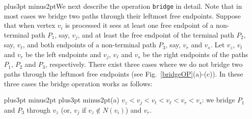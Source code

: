 \documentclass[10pt]{article}
\def\yskip{\penalty-50\vskip3pt plus3pt minus2pt}
\def\y{\yskip}
\def\yy{\yskip\yskip}
\begin{document}
\y We next describe the operation {\tt bridge} in detail. Note
that in most cases we bridge two paths through their leftmost free
endpoints. Suppose that when vertex $v_i$ is processed it sees at
least one free endpoint of a non-terminal path $P_1$, say, $v_j$,
and at least the free endpoint of the terminal path $P_2$, say,
$v_\ell$, and both endpoints of a non-terminal path $P_3$, say,
$v_r$ and $v_s$. Let $v_z$, $v_t$ and $v_r$ be the left endpoints
and $v_j$, $v_\ell$ and $v_s$ be the right endpoints of the paths
$P_1$, $P_2$ and $P_3$, respectively. There exist three cases
where we do not bridge two paths through the leftmost free
endpoints (see Fig.~\ref{bridgeOP}(a)-(c)). In these three cases
the bridge operation works as follows:

\yy \noindent (a) $v_z<v_j<v_t<v_\ell<v_r<v_s$: we bridge $P_1$
and $P_3$ through $v_z$ (or, $v_j$ if $v_z \notin N(v_i)$) and
$v_r$.
\end{document}
